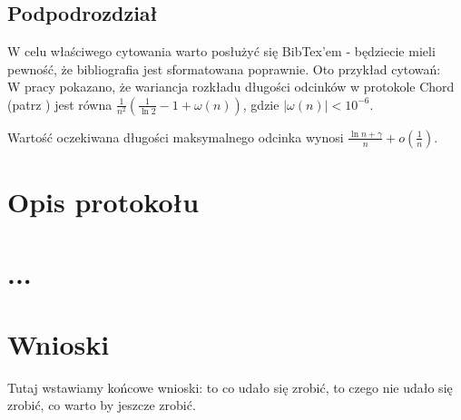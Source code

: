\subsection{Podpodrozdział}

  W celu właściwego cytowania warto posłużyć się BibTex'em -
  będziecie
  mieli pewność, że bibliografia jest sformatowana poprawnie.
  Oto przykład cytowań:
  \\

  W pracy \cite{JCIRandom} pokazano, że wariancja rozkładu
  długości odcinków w protokole Chord (patrz \cite{Chord2001}) jest równa
  $\frac{1}{n^2}(\frac{1}{\ln 2} - 1 + \omega(n))$, gdzie
  $|\omega(n)| < 10^{-6}$.

  \begin{theorem}
    Wartość oczekiwana długości maksymalnego odcinka wynosi
    $\frac{\ln n+\gamma}{n} + o(\frac{1}{n})$.
  \end{theorem}


\section{Opis protokołu}
\section{...}
\section{Wnioski}

Tutaj wstawiamy końcowe wnioski: to co udało się zrobić, 
to czego
nie udało się zrobić, co warto by jeszcze zrobić.